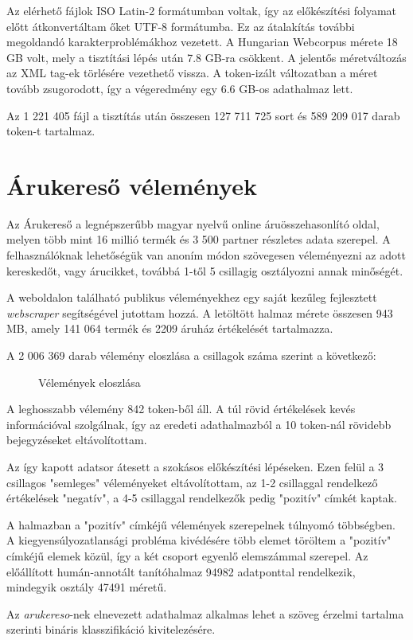 Az elérhető fájlok ISO Latin-2 formátumban voltak, így az előkészítési folyamat előtt átkonvertáltam őket UTF-8 formátumba. Ez az átalakítás további megoldandó karakterproblémákhoz vezetett. A Hungarian Webcorpus mérete 18 GB volt, mely a tisztítási lépés után 7.8 GB-ra csökkent. A jelentős méretváltozás az XML tag-ek törlésére vezethető vissza. A token-izált változatban a méret tovább zsugorodott, így a végeredmény egy 6.6 GB-os adathalmaz lett.

Az 1 221 405 fájl a tisztítás után összesen 127 711 725 sort és 589 209 017 darab token-t tartalmaz.

\section{Árukereső vélemények}
Az Árukereső \cite{arukereso} a legnépszerűbb magyar nyelvű online áruösszehasonlító oldal, melyen több mint 16 millió termék és 3 500 partner részletes adata szerepel. A felhasználóknak lehetőségük van anoním módon szövegesen véleményezni az adott kereskedőt, vagy árucikket, továbbá 1-től 5 csillagig osztályozni annak minőségét.

A weboldalon található publikus véleményekhez egy saját kezűleg fejlesztett \textit{webscraper} segítségével jutottam hozzá. A letöltött halmaz mérete összesen 943 MB, amely 141 064 termék és 2209 áruház értékelését tartalmazza. 

A 2 006 369 darab vélemény eloszlása a csillagok száma szerint a következő:

\begin{figure}[H]
	\centering
	\hspace{5pt}
	\caption{Vélemények eloszlása}
	\label{fig:arukereso}
\end{figure}

A leghosszabb vélemény 842 token-ből áll. A túl rövid értékelések kevés információval szolgálnak, így az eredeti adathalmazból a 10 token-nál rövidebb bejegyzéseket eltávolítottam.

Az így kapott adatsor átesett a szokásos előkészítési lépéseken. Ezen felül a 3 csillagos "semleges" véleményeket eltávolítottam, az 1-2 csillaggal rendelkező értékelések "negatív", a 4-5 csillaggal rendelkezők pedig "pozitív" címkét kaptak.

A halmazban a "pozitív" címkéjű vélemények szerepelnek túlnyomó többségben. A kiegyensúlyozatlansági probléma kivédésére több elemet töröltem a "pozitív" címkéjű elemek közül, így a két csoport egyenlő elemszámmal szerepel. Az előállított humán-annotált tanítóhalmaz 94982 adatponttal rendelkezik, mindegyik osztály 47491 méretű. 

Az \textit{arukereso}-nek elnevezett adathalmaz alkalmas lehet a szöveg érzelmi tartalma szerinti bináris klasszifikáció kivitelezésére. 




